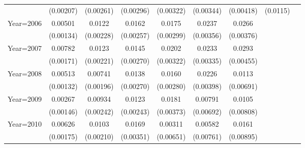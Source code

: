 \begin{table}[htbp]
\begin{tabular}{l*{8}{c}}
                    &   (0.00207)         &   (0.00261)         &   (0.00296)         &   (0.00322)         &   (0.00344)         &   (0.00418)         &    (0.0115)         &                     \\
[1em]
Year=2006           &     0.00501\sym{***}&      0.0122\sym{***}&      0.0162\sym{***}&      0.0175\sym{***}&      0.0237\sym{***}&      0.0266\sym{***}&                     &                     \\
                    &   (0.00134)         &   (0.00228)         &   (0.00257)         &   (0.00299)         &   (0.00356)         &   (0.00376)         &                     &                     \\
[1em]
Year=2007           &     0.00782\sym{***}&      0.0123\sym{***}&      0.0145\sym{***}&      0.0202\sym{***}&      0.0233\sym{***}&      0.0293\sym{***}&                     &                     \\
                    &   (0.00171)         &   (0.00221)         &   (0.00270)         &   (0.00322)         &   (0.00335)         &   (0.00455)         &                     &                     \\
[1em]
Year=2008           &     0.00513\sym{***}&     0.00741\sym{***}&      0.0138\sym{***}&      0.0160\sym{***}&      0.0226\sym{***}&      0.0113         &                     &                     \\
                    &   (0.00132)         &   (0.00196)         &   (0.00270)         &   (0.00280)         &   (0.00398)         &   (0.00691)         &                     &                     \\
[1em]
Year=2009           &     0.00267\sym{*}  &     0.00934\sym{***}&      0.0123\sym{***}&      0.0181\sym{***}&     0.00791         &      0.0105         &                     &                     \\
                    &   (0.00146)         &   (0.00242)         &   (0.00243)         &   (0.00373)         &   (0.00692)         &   (0.00808)         &                     &                     \\
[1em]
Year=2010           &     0.00626\sym{***}&      0.0103\sym{***}&      0.0169\sym{***}&     0.00311         &     0.00582         &      0.0161\sym{*}  &                     &                     \\
                    &   (0.00175)         &   (0.00210)         &   (0.00351)         &   (0.00651)         &   (0.00761)         &   (0.00895)         &                     &                     \\

\end{tabular}
\end{table}
